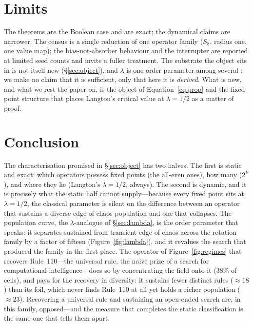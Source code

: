 \documentclass[man,12pt,floatsintext]{apa7}
\begin{document}
\section{Limits}
\label{sec:limits}

The theorems are the Boolean case and are exact; the dynamical claims are
narrower. The census is a single reduction of one operator family
($S_8$, radius one, one value map); the bias-not-absorber behaviour and the
interrupter are reported at limited seed counts and invite a fuller
treatment. The substrate the object sits in is not itself new
(\S\ref{sec:object}), and $\lambda$ is one order parameter among several
\parencite{wuensche1999classifying}; we make no claim that it is
sufficient, only that here it is \emph{derived}. What is new, and what we
rest the paper on, is the object of Equation~\eqref{eq:prop} and the
fixed-point structure that places Langton's critical value at
$\lambda = 1/2$ as a matter of proof.

\section{Conclusion}
\label{sec:conclusion}

The characterisation promised in \S\ref{sec:object} has two halves. The
first is static and exact: which operators possess fixed points (the
all-even ones), how many ($2^k$), and where they lie (Langton's
$\lambda = 1/2$, always). The second is dynamic, and it is precisely what
the static half cannot supply---because every fixed point sits at
$\lambda = 1/2$, the classical parameter is silent on the difference between
an operator that sustains a diverse edge-of-chaos population and one that
collapses. The population curve, the $\lambda$-analogue of
\S\ref{sec:lambda}, is the order parameter that speaks: it separates
sustained from transient edge-of-chaos across the rotation family by a
factor of fifteen (Figure~\ref{fig:lambda}), and it revalues the search that
produced the family in the first place. The operator of
Figure~\ref{fig:regimes} that recovers Rule~110---the universal rule, the
naive prize of a search for computational intelligence---does so by
concentrating the field onto it ($38\%$ of cells), and pays for the
recovery in diversity: it sustains fewer distinct rules ($\approx 18$) than
its foil, which never finds Rule~110 at all yet holds a richer population
($\approx 23$). Recovering a universal rule and sustaining an open-ended
search are, in this family, opposed---and the measure that completes the
static classification is the same one that tells them apart.

\printbibliography
\end{document}
